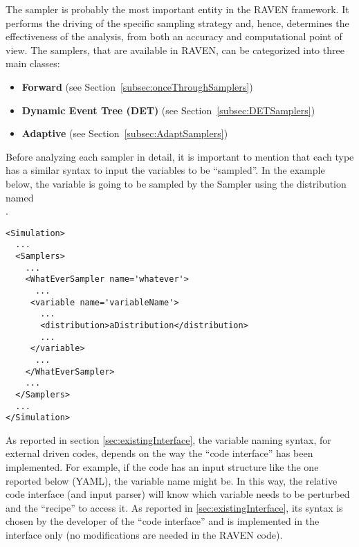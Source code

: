 
The sampler is probably the most important entity in the RAVEN framework.
%
It performs the driving of the specific sampling strategy and, hence, determines
the effectiveness of the analysis, from both an accuracy and computational point
of view.
%
The samplers, that are available in RAVEN, can be categorized into three main
classes:
\begin{itemize}
\item \textbf{Forward} (see Section~\ref{subsec:onceThroughSamplers})
\item \textbf{Dynamic Event Tree (DET)} (see Section~\ref{subsec:DETSamplers})
\item \textbf{Adaptive} (see Section~\ref{subsec:AdaptSamplers})
\end{itemize}
Before analyzing each sampler in detail, it is important to mention that each
type has a similar syntax to input the variables to be ``sampled''.
%
In the example below, the variable  is going to be
sampled by the Sampler  using the distribution named\\
.
\begin{lstlisting}[style=XML]
<Simulation>
  ...
  <Samplers>
    ...
    <WhatEverSampler name='whatever'>
      ...
     <variable name='variableName'>
       ...
       <distribution>aDistribution</distribution>
       ...
     </variable>
      ...
    </WhatEverSampler>
    ...
  </Samplers>
  ...
</Simulation>
\end{lstlisting}

As reported in section \ref{sec:existingInterface}, the variable naming syntax,
for external driven codes, depends on the way the ``code interface'' has been
implemented.
%
For example, if the code has an input structure like the one reported below (YAML), the
variable name might be.
%
In this way, the relative code interface (and input parser) will know which
variable needs to be perturbed and the ``recipe'' to access it.
%
As reported in \ref{sec:existingInterface}, its syntax is chosen by the
developer of the ``code interface'' and is implemented in the interface only
(no modifications are needed in the RAVEN code).


